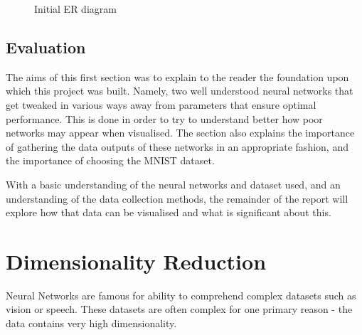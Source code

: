 \documentclass[a4paper,11pt,titlepage]{article}
\begin{document}
	\begin{figure}[H]
    			\caption{Initial ER diagram}%
	\end{figure}	

	
\subsection{Evaluation}
The aims of this first section was to explain to the reader the foundation upon which this project was built. Namely, two well understood neural networks that get tweaked in various ways away from parameters that ensure optimal performance. This is done in order to try to understand better how poor networks may appear when visualised. The section also explains the importance of gathering the data outputs of these networks in an appropriate fashion, and the importance of choosing the MNIST dataset. 
	\par 
	With a basic understanding of the neural networks and dataset used, and an understanding of the data collection methods, the remainder of the report will explore how that data can be visualised and what is significant about this.

\clearpage
	
\section{Dimensionality Reduction}

Neural Networks are famous for ability to comprehend complex datasets such as vision or speech. These datasets are often complex for one primary reason - the data contains very high dimensionality.
\end{document}
